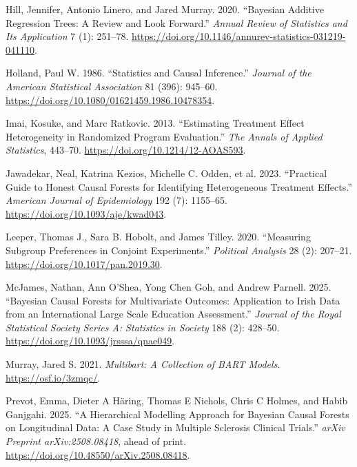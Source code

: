 \documentclass[
  10pt,
  a4paper,
  DIV=11,
  numbers=noendperiod]{scrartcl}
\newlength{\cslhangindent}
\newenvironment{CSLReferences}[2] %
 {\begin{list}{}{%
  \setlength{\itemindent}{0pt}
  \setlength{\leftmargin}{0pt}
  \setlength{\parsep}{0pt}
  \ifodd #1
   \setlength{\leftmargin}{\cslhangindent}
   \setlength{\itemindent}{-1\cslhangindent}
  \fi
  \setlength{\itemsep}{#2\baselineskip}}}
 {\end{list}}
\begin{document}
\begin{CSLReferences}{1}{1}
Hill, Jennifer, Antonio Linero, and Jared Murray. 2020. {``Bayesian
Additive Regression Trees: A Review and Look Forward.''} \emph{Annual
Review of Statistics and Its Application} 7 (1): 251--78.
\url{https://doi.org/10.1146/annurev-statistics-031219-041110}.

Holland, Paul W. 1986. {``Statistics and Causal Inference.''}
\emph{Journal of the American Statistical Association} 81 (396):
945--60. \url{https://doi.org/10.1080/01621459.1986.10478354}.

Imai, Kosuke, and Marc Ratkovic. 2013. {``Estimating Treatment Effect
Heterogeneity in Randomized Program Evaluation.''} \emph{The Annals of
Applied Statistics}, 443--70. \url{https://doi.org/10.1214/12-AOAS593}.

Jawadekar, Neal, Katrina Kezios, Michelle C. Odden, et al. 2023.
{``Practical Guide to Honest Causal Forests for Identifying
Heterogeneous Treatment Effects.''} \emph{American Journal of
Epidemiology} 192 (7): 1155--65.
\url{https://doi.org/10.1093/aje/kwad043}.

Leeper, Thomas J., Sara B. Hobolt, and James Tilley. 2020. {``Measuring
Subgroup Preferences in Conjoint Experiments.''} \emph{Political
Analysis} 28 (2): 207--21. \url{https://doi.org/10.1017/pan.2019.30}.

McJames, Nathan, Ann O'Shea, Yong Chen Goh, and Andrew Parnell. 2025.
{``Bayesian Causal Forests for Multivariate Outcomes: Application to
Irish Data from an International Large Scale Education Assessment.''}
\emph{Journal of the Royal Statistical Society Series A: Statistics in
Society} 188 (2): 428--50. \url{https://doi.org/10.1093/jrsssa/qnae049}.

Murray, Jared S. 2021. \emph{Multibart: A Collection of BART Models}.
\url{https://osf.io/3zmqc/}.

Prevot, Emma, Dieter A Häring, Thomas E Nichols, Chris C Holmes, and
Habib Ganjgahi. 2025. {``A Hierarchical Modelling Approach for Bayesian
Causal Forests on Longitudinal Data: A Case Study in Multiple Sclerosis
Clinical Trials.''} \emph{arXiv Preprint arXiv:2508.08418}, ahead of
print. \url{https://doi.org/10.48550/arXiv.2508.08418}.


\end{CSLReferences}
\end{document}
